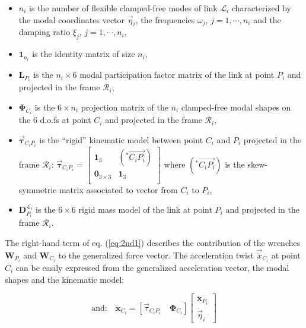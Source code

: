 \documentclass[smallcondensed]{svjour3}     %
\begin{document}
\begin{itemize}
	\item $n_i$ is the number of flexible clamped-free modes of link $\mathcal{L}_i$ characterized by the  modal coordinates vector $\vec{\eta}_i$, the frequencies $\omega_j$, $j=1,\cdots,n_i$ and the damping ratio $\xi_j$, $j=1,\cdots,n_i$,
	\item $\mathbf{1}_{n_i}$ is the identity matrix of size $n_i$,
	\item $\mathbf{L}_{P_i}$ is the $n_i\times 6$ modal participation factor matrix of the link at point $P_i$ and projected in the frame $\mathcal{R}_i$, 
	\item $\mathbf{\Phi}_{C_i}$ is the  $6\times n_i$ projection matrix of the $n_i$ clamped-free modal shapes on the $6$ d.o.fs at point $C_i$ and projected in the frame $\mathcal{R}_i$,
	\item $\mathbf{\vec{\tau}}_{C_iP_i}$ is the ``rigid'' kinematic model between point $C_i$ and $P_i$ projected in the frame $\mathcal{R}_i$: $\mathbf{\vec{\tau}}_{C_iP_i}=\left[\begin{array}{cc}
	\mathbf{1}_3  & (^*\overrightarrow{C_iP_i})\\
	\mathbf{0}_{3\times 3} & \mathbf{1}_3  \\
	\end{array}\right]$ where $(^*\overrightarrow{C_iP_i})$ is the skew-symmetric matrix associated to vector from $C_i$ to $P_i$,
	\item $\mathbf{D}^{\mathcal{L}_i}_{P_i}$ is the $6 \times 6$  rigid mass model of the link at point $P_i$ and projected in the frame $\mathcal{R}_i$.
\end{itemize}


The right-hand term of eq. (\ref{eq:2nd1}) describes the contribution of the wrenches $\mathbf{W}_{P_i}$ and $\mathbf{W}_{C_i}$ to the generalized force vector. The acceleration twist $\vec{\ddot{x}}_{C_i}$ at point $C_i$ can be easily expressed from the generalized acceleration vector, the modal shapes and the kinematic model:

\begin{small}
	\begin{equation}\label{eq:2ndb}
\mbox{and:}\quad \ddot{\mathbf{x}}_{C_i}=[\vec{\tau}_{C_iP_i}\quad \mathbf{\Phi}_{C_i}]\left[\begin{array}{c}\ddot{\mathbf{x}}_{P_i}\\ \ddot{\vec{\eta}}_i\end{array}\right]
\end{equation}
\end{small}
\end{document}
